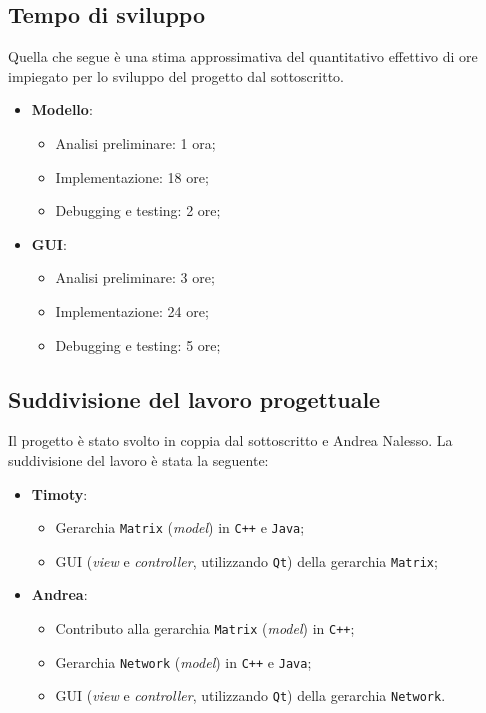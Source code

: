 \subsection{Tempo di sviluppo} 
Quella che segue è una stima approssimativa del 
quantitativo effettivo di ore impiegato per lo sviluppo del progetto dal sottoscritto.
\begin{itemize}
    \item \textbf{Modello}:
    \begin{itemize}
        \item Analisi preliminare: 1 ora;
        \item Implementazione: 18 ore;
        \item Debugging e testing: 2 ore;
    \end{itemize}
    \item \textbf{GUI}:
    \begin{itemize}
        \item Analisi preliminare: 3 ore;
        \item Implementazione: 24 ore;
        \item Debugging e testing: 5 ore;
    \end{itemize}
\end{itemize}

\subsection{Suddivisione del lavoro progettuale}
Il progetto è stato svolto in coppia dal sottoscritto e Andrea Nalesso. La suddivisione del 
lavoro è stata la seguente:
\begin{itemize}
    \item \textbf{Timoty}:
    \begin{itemize}
        \item Gerarchia \texttt{Matrix} (\emph{model}) in \texttt{C++} e \texttt{Java};
        \item GUI (\emph{view} e \emph{controller}, utilizzando \texttt{Qt}) della gerarchia \texttt{Matrix};
    \end{itemize}
    \item \textbf{Andrea}:
    \begin{itemize}
        \item Contributo alla gerarchia \texttt{Matrix} (\emph{model}) in \texttt{C++};
        \item Gerarchia \texttt{Network} (\emph{model}) in \texttt{C++} e \texttt{Java};
        \item GUI (\emph{view} e \emph{controller}, utilizzando \texttt{Qt}) della gerarchia \texttt{Network}.
    \end{itemize}
\end{itemize}

